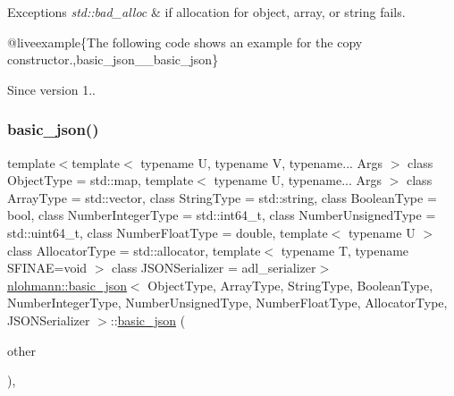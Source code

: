 \begin{DoxyExceptions}{Exceptions}
{\em std\+::bad\+\_\+alloc} & if allocation for object, array, or string fails.\\
\hline
\end{DoxyExceptions}
@liveexample\{The following code shows an example for the copy constructor.,basic\+\_\+json\+\_\+\+\_\+basic\+\_\+json\}

\begin{DoxySince}{Since}
version 1.. 
\end{DoxySince}
\mbox{\label{classnlohmann_1_1basic__json_a9a06d1efd50a00f4889f831f851ce124}} 
\subsubsection{\texorpdfstring{basic\_json()}{basic\_json()}\hspace{0.1cm}{\footnotesize\ttfamily [9/9]}}
{\footnotesize\ttfamily template$<$template$<$ typename U, typename V, typename... Args $>$ class Object\+Type = std\+::map, template$<$ typename U, typename... Args $>$ class Array\+Type = std\+::vector, class String\+Type  = std\+::string, class Boolean\+Type  = bool, class Number\+Integer\+Type  = std\+::int64\+\_\+t, class Number\+Unsigned\+Type  = std\+::uint64\+\_\+t, class Number\+Float\+Type  = double, template$<$ typename U $>$ class Allocator\+Type = std\+::allocator, template$<$ typename T, typename S\+F\+I\+N\+A\+E=void $>$ class J\+S\+O\+N\+Serializer = adl\+\_\+serializer$>$ \\
\mbox{\hyperlink{classnlohmann_1_1basic__json}{nlohmann\+::basic\+\_\+json}}$<$ Object\+Type, Array\+Type, String\+Type, Boolean\+Type, Number\+Integer\+Type, Number\+Unsigned\+Type, Number\+Float\+Type, Allocator\+Type, J\+S\+O\+N\+Serializer $>$\+::\mbox{\hyperlink{classnlohmann_1_1basic__json}{basic\+\_\+json}} (\begin{DoxyParamCaption}\item[{\mbox{\hyperlink{classnlohmann_1_1basic__json}{basic\+\_\+json}}$<$ Object\+Type, Array\+Type, String\+Type, Boolean\+Type, Number\+Integer\+Type, Number\+Unsigned\+Type, Number\+Float\+Type, Allocator\+Type, J\+S\+O\+N\+Serializer $>$ \&\&}]{other }\end{DoxyParamCaption})\hspace{0.3cm}{\ttfamily [inline]}, {\ttfamily [noexcept]}}



